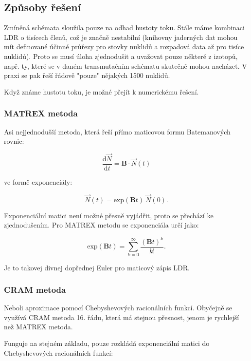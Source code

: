 \subsection{Způsoby řešení}

Zmíněná schémata sloužila pouze na odhad hustoty toku. Stále máme kombinaci LDR o tisícech členů, což je značně nestabilní (knihovny jaderných dat mohou mít definované účinné průřezy pro stovky nuklidů a rozpadová data až pro tisíce nuklidů). Proto se musí úloha zjednodušit a uvažovat pouze některé z izotopů, např. ty, které se v daném transmutačním schématu skutečně mohou nacházet. V praxi se pak řeší řádově "pouze" nějakých 1500 nuklidů.

Když známe hustotu toku, je možné přejít k numerickému řešení.

\subsubsection{MATREX metoda}

Asi nejjednodušší metoda, která řeší přímo maticovou formu Batemanových rovnic:

\begin{equation}
  \dfrac{\text{d}\vec{N}}{\text{d}t} = \mathbf{B} \cdot \vec{N}(t)
\end{equation}

ve formě exponenciály:

\begin{equation}
  \vec{N}(t) = \text{exp} (\mathbf{B}t) \: \vec{N}(0).
\end{equation}

Exponenciální matici není možné přesně vyjádřit, proto se přechází ke zjednodušením. Pro MATREX metodu se exponenciála určí jako:

$$ \text{exp} (\mathbf{B}t) = \sum_{k=0}^\infty \dfrac{(\mathbf{B}t)^k}{k!}. $$

Je to takovej divnej dopřednej Euler pro maticový zápis LDR. 

\subsubsection{CRAM metoda}

Neboli aproximace pomocí Chebyshevových racionálních funkcí. Obyčejně se využívá CRAM metoda 16. řádu, která má stejnou přesnost, jenom je rychlejší než MATREX metoda.

Funguje na stejném základu, pouze rozkládá exponenciální matici do Chebyshevových racionálních funkcí:

